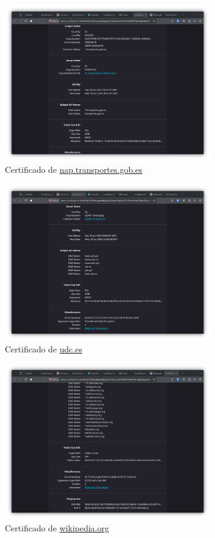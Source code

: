 \begin{figure}[H]
    \centering
    \includegraphics[width=0.8\textwidth]{cert-transportes.png}
    \caption{Certificado de \url{nap.transportes.gob.es}}
\end{figure}

\begin{figure}[H]
    \centering
    \includegraphics[width=0.8\textwidth]{cert-udc.png}
    \caption{Certificado de \url{udc.es}}
\end{figure}

\begin{figure}[H]
    \centering
    \includegraphics[width=0.8\textwidth]{cert-wikipedia.png}
    \caption{Certificado de \url{wikipedia.org}}
\end{figure}

